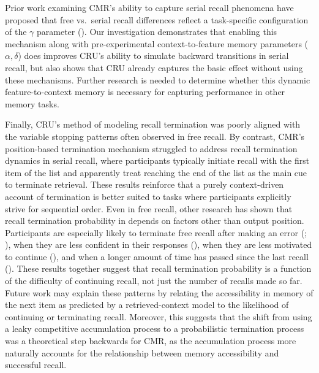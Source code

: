 \documentclass[
  man,
  floatsintext,
  longtable,
  nolmodern,
  notxfonts,
  notimes,
  draftfirst,
  colorlinks=true,linkcolor=blue,citecolor=blue,urlcolor=blue]{apa7}
\begin{document}
Prior work examining CMR's ability to capture serial recall phenomena
have proposed that free vs.~serial recall differences reflect a
task-specific configuration of the \(\gamma\) parameter
(). Our investigation
demonstrates that enabling this mechanism along with pre-experimental
context-to-feature memory parameters (\(\alpha, \delta\)) does improves
CRU's ability to simulate backward transitions in serial recall, but
also shows that CRU already captures the basic effect without using
these mechanisms. Further research is needed to determine whether this
dynamic feature-to-context memory is necessary for capturing performance
in other memory tasks.

Finally, CRU's method of modeling recall termination was poorly aligned
with the variable stopping patterns often observed in free recall. By
contrast, CMR's position-based termination mechanism struggled to
address recall termination dynamics in serial recall, where participants
typically initiate recall with the first item of the list and apparently
treat reaching the end of the list as the main cue to terminate
retrieval. These results reinforce that a purely context-driven account
of termination is better suited to tasks where participants explicitly
strive for sequential order. Even in free recall, other research has
shown that recall termination probability in depends on factors other
than output position. Participants are especially likely to terminate
free recall after making an error
(;
), when they
are less confident in their responses
(), when they
are less motivated to continue
(),
and when a longer amount of time has passed since the last recall
().
These results together suggest that recall termination probability is a
function of the difficulty of continuing recall, not just the number of
recalls made so far. Future work may explain these patterns by relating
the accessibility in memory of the next item as predicted by a
retrieved-context model to the likelihood of continuing or terminating
recall. Moreover, this suggests that the shift from using a leaky
competitive accumulation process to a probabilistic termination process
was a theoretical step backwards for CMR, as the accumulation process
more naturally accounts for the relationship between memory
accessibility and successful recall.
\end{document}
